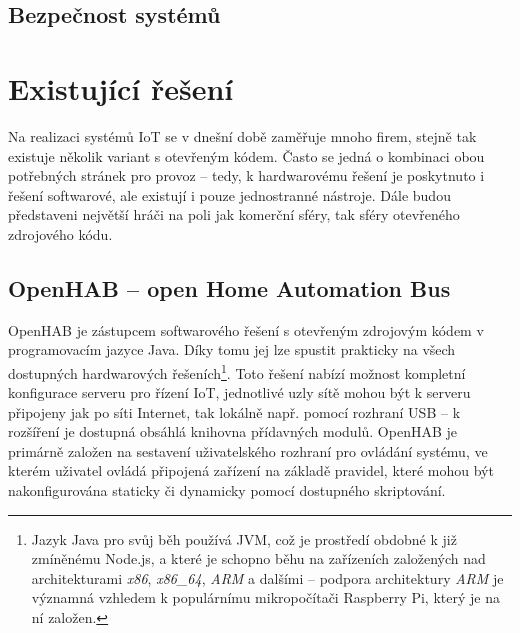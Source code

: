 

\subsection*{Bezpečnost systémů}


\section{Existující řešení}\label{sec:existujici-reseni}

Na realizaci systémů IoT se v dnešní době zaměřuje mnoho firem, stejně tak existuje několik variant s otevřeným kódem.
Často se jedná o kombinaci obou potřebných stránek pro provoz -- tedy, k hardwarovému řešení je poskytnuto i řešení
softwarové, ale existují i pouze jednostranné nástroje.
Dále budou představeni největší hráči na poli jak komerční sféry, tak sféry otevřeného zdrojového kódu.

\subsection{OpenHAB -- open Home Automation Bus}\label{subsec:openhab}
OpenHAB je zástupcem softwarového řešení s otevřeným zdrojovým kódem v programovacím jazyce Java.
Díky tomu jej lze spustit prakticky na všech dostupných hardwarových řešeních\footnote{Jazyk Java pro svůj běh
používá JVM, což je prostředí obdobné k již zmíněnému Node.js, a které je schopno běhu na zařízeních založených nad
architekturami \textit{x86}, \textit{x86\_64}, \textit{ARM} a dalšími -- podpora architektury \textit{ARM} je
významná vzhledem k populárnímu mikropočítači Raspberry Pi, který je na ní založen.}.
Toto řešení nabízí možnost kompletní konfigurace serveru pro řízení IoT, jednotlivé uzly sítě mohou být k serveru
připojeny jak po síti Internet, tak lokálně např. pomocí rozhraní USB -- k rozšíření je dostupná obsáhlá
knihovna přídavných modulů.
OpenHAB je primárně založen na sestavení uživatelského rozhraní pro ovládání systému, ve kterém uživatel ovládá
připojená zařízení na základě pravidel, které mohou být nakonfigurována staticky či dynamicky pomocí dostupného
skriptování.


